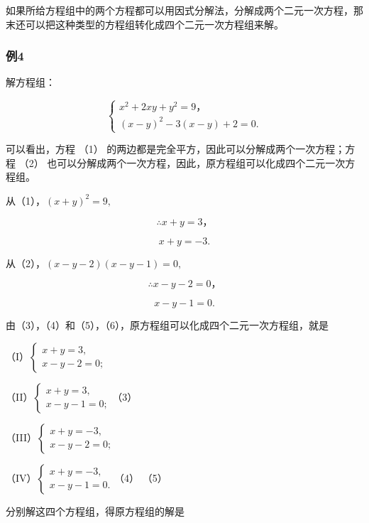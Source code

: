 如果所给方程组中的两个方程都可以用因式分解法，分解成两个二元一次方程，那末还可以把这种类型的方程组转化成四个二元一次方程组来解。

\subsubsection{例4}

解方程组：

\[
\left\{ \begin{array}{l} x ^ {2} + 2 x y + y ^ {2} = 9\text{，} \\ (x - y) ^ {2} - 3 (x - y) + 2 = 0. \end{array} \right. \tag{1}
\]

 可以看出，方程 （1）
的两边都是完全平方，因此可以分解成两个一次方程；方程 （2）
也可以分解成两个一次方程，因此，原方程组可以化成四个二元一次方程组。

 从（1），\((x + y)^{2} = 9,\)

\[
\therefore x + y = 3\text{，} \tag{3}
\]

\[
x + y = - 3. \tag{4}
\]

从（2），\((x - y - 2)(x - y - 1) = 0,\)

\[
\therefore x - y - 2 = 0\text{，} \tag{5}
\]

\[
x - y - 1 = 0. \tag{6}
\]

由（3），（4）和（5），（6），原方程组可以化成四个二元一次方程组，就是

（I）\(\left\{ \begin{array}{l} x + y = 3, \\ x - y - 2 = 0; \end{array} \right.\)

（II）\(\left\{ \begin{array}{l} x + y = 3, \\ x - y - 1 = 0; \end{array} \right.\)（3）

（III）\(\left\{ \begin{array}{l} x + y = -3, \\ x - y - 2 = 0; \end{array} \right.\)

（IV）\(\left\{ \begin{array}{l} x + y = -3, \\ x - y - 1 = 0. \end{array} \right.\)（4）
（5）

分别解这四个方程组，得原方程组的解是

